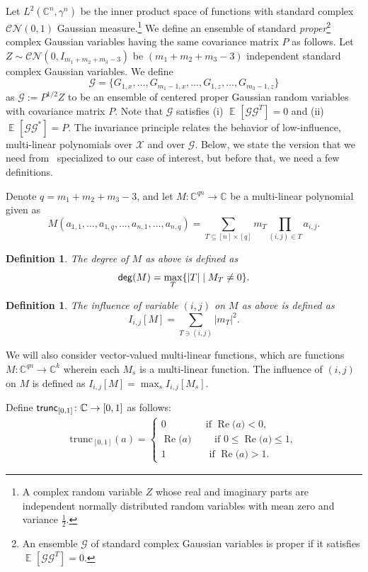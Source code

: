 \documentclass[11pt]{article}
\newtheorem{definition}[thm]{Definition}
\newcommand\card[1]{\left| {#1} \right|}
\newcommand\Expect[2]{{\mathop{\mathbb{E}}_{#1}\left[ {#2} \right]}}
\renewcommand\leq{\leqslant}
\begin{document}
Let $L^2(\mathbb{C}^n, \gamma^n)$ be the inner product space of functions with standard complex $\mathcal{C}\mathcal{N}(0, 1)$ Gaussian measure.\footnote{A complex random variable $Z$ whose real and imaginary parts are independent normally distributed random variables with mean zero and variance $\frac{1}{2}$.} We define an ensemble of standard {\em proper}\footnote{An ensemble $\mathcal{G}$ of standard complex Gaussian variables is proper if it satisfies $\Expect{}{\mathcal{G}\mathcal{G}^T}=0$.} complex Gaussian variables having the same covariance matrix $P$ as follows.  Let $Z\sim \mathcal{C}\mathcal{N}(0, I_{m_1+m_2+m_3-3})$ be $(m_1+m_2+m_3-3)$ independent standard complex Gaussian variables. We define 
%
\[
\mathbf{\mathcal{G}} = \{G_{1,x},\ldots,G_{m_1-1, x},\ldots, G_{1,z},\ldots,G_{m_3-1, z}\}
\]
as $\mathcal{G}:= P^{1/2}Z$ to be an ensemble of centered proper Gaussian random variables with covariance matrix $P$. Note that $\mathcal{G}$ satisfies (i) $\Expect{}{\mathcal{G}\mathcal{G}^T}=0$ and (ii) $\Expect{}{\mathcal{G}\mathcal{G}^*}=P$. The invariance principle relates
the behavior of low-influence, multi-linear polynomials over $\mathcal{X}$ and over $\mathbf{\mathcal{G}}$. Below, we state
the version that we need from~\cite{Mossel} specialized to our case of interest, but before that, we need a few definitions.

Denote $q = m_1+m_2+m_3-3$, and let $M\colon \mathbb{C}^{q n}\to\mathbb{C}$ be a multi-linear polynomial given as
\[
M(a_{1,1},\ldots,a_{1,q},\ldots, a_{n,1},\ldots, a_{n,q})
=\sum\limits_{T\subseteq [n]\times [q]}m_T \prod\limits_{(i,j)\in T} a_{i,j}.
\]

\begin{definition}
	The degree of $M$ as above is defined as
	\[
	{\sf deg}(M) = \max_{T}\{ \card{T} \mid M_T \neq 0\}.
	\]
\end{definition}

\begin{definition}
	The influence of variable $(i,j)$ on $M$ as above is defined as
	\[
	I_{i,j}[M] = \sum\limits_{T\ni (i,j)}\card{m_T}^2.
	\]
\end{definition}
We will also consider vector-valued multi-linear functions, which are functions
$M\colon \mathbb{C}^{qn}\to\mathbb{C}^{k}$ wherein each $M_s$ is a multi-linear function.
The influence of $(i,j)$ on $M$ is defined as $I_{i,j}[M] = \max_{s}I_{i,j}[M_s]$.

Define ${\sf trunc}_{[0,1]}\colon\mathbb{C}\to [0,1]$ as follows:
%
\begin{align*}
	\mathrm{trunc}_{[0,1]}(a) =  \begin{cases}
		0 \qquad  \qquad \mbox{if $\operatorname{Re}$($a$)} < 0,\\
		\mbox{$\operatorname{Re}$($a$)} \qquad  \mbox{ if } 0 \leq \mbox{$\operatorname{Re}$($a$)} \leq 1,\\
		1  \qquad \qquad  \mbox{ if } \mbox{$\operatorname{Re}$($a$)} > 1.
	\end{cases}
\end{align*}
\end{document}

